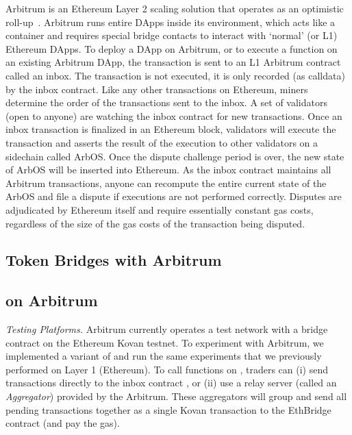 Arbitrum is an Ethereum Layer 2 scaling solution that operates as an optimistic roll-up~\cite{kalodner2018arbitrum}. Arbitrum runs entire DApps inside its environment, which acts like a container and requires special bridge contacts to interact with `normal' (or L1) Ethereum DApps. To deploy a DApp on Arbitrum, or to execute a function on an existing Arbitrum DApp, the transaction is sent to an L1 Arbitrum contract called an inbox. The transaction is not executed, it is only recorded (as calldata) by the inbox contract. Like any other transactions on Ethereum, miners determine the order of the transactions sent to the inbox. A set of validators (open to anyone) are watching the inbox contract for new transactions. Once an inbox transaction is finalized in an Ethereum block, validators will execute the transaction and asserts the result of the execution to other validators on a sidechain called ArbOS. Once the dispute challenge period is over, the new state of ArbOS will be inserted into Ethereum. As the inbox contract maintains all Arbitrum transactions, anyone can recompute the entire current state of the ArbOS and file a dispute if executions are not performed correctly. Disputes are adjudicated by Ethereum itself and require essentially constant gas costs, regardless of the size of the gas costs of the transaction being disputed.  



\subsection{Token Bridges with Arbitrum}


\subsection{\cm on Arbitrum}

\textit{Testing Platforms.} Arbitrum currently operates a test network with a bridge contract on the Ethereum Kovan testnet. To experiment with Arbitrum, we implemented a variant of \cm and run the same experiments that we previously performed on Layer 1 (Ethereum). To call functions on \cm, traders can (i) send transactions directly to the inbox contract \href{https://kovan.etherscan.io/address/0x76bF1345224fE606E2aB38B8E52B83512328A9DF}, or (ii) use a relay server (called an \textit{Aggregator}) provided by the Arbitrum. These aggregators will group and send all pending transactions together as a single Kovan transaction to the EthBridge contract (and pay the gas).

